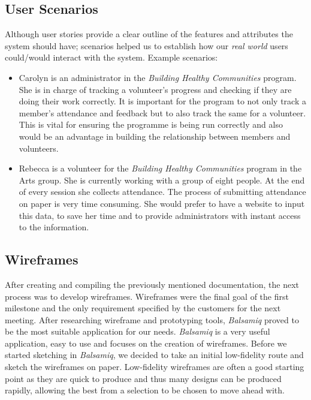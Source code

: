 \documentclass{l3proj}
\begin{document}
\subsection{User Scenarios}
\label{user_scenarios}

Although user stories provide a clear outline of the features and attributes the system should have; scenarios helped us to establish how our \textit{real world} users could/would interact with the system.
Example scenarios:
\begin{itemize}
\item Carolyn is an administrator in the \textit{Building Healthy Communities} program. She is in charge of tracking a volunteer's progress and checking if they are doing their work correctly. It is important for the program to not only track a member's attendance and feedback but to also track the same for a volunteer. This is vital for ensuring the programme is being run correctly and also would be an advantage in building the relationship between members and volunteers.

\item Rebecca is a volunteer for the \textit{Building Healthy Communities} program in the Arts group. She is currently working with a group of eight people. At the end of every session she collects attendance. The process of submitting attendance on paper is very time consuming. She would prefer to have a website to input this data, to save her time and to provide administrators with instant access to the information.
\end{itemize}

\subsection{Wireframes}
\label{wireframes}

After creating and compiling the previously mentioned documentation, the next process was to develop wireframes. Wireframes were the final goal of the first milestone and the only requirement specified by the customers for the next meeting. After researching wireframe and prototyping tools, \textit{Balsamiq} proved to be the most suitable application for our needs. \textit{Balsamiq} is a very useful application, easy to use and focuses on the creation of wireframes. Before we started sketching in \textit{Balsamiq}, we decided to take an initial low-fidelity route and sketch the wireframes on paper. Low-fidelity wireframes are often a good starting point as they are quick to produce and thus many designs can be produced rapidly, allowing the best from a selection to be chosen to move ahead with.
\end{document}
